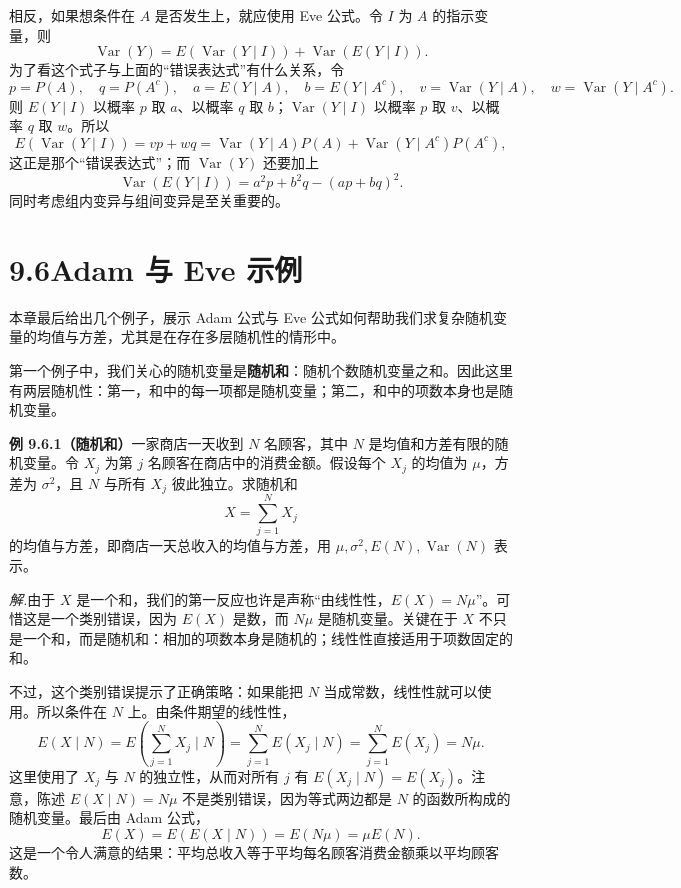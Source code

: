 \documentclass[UTF8, 12pt, fontset=fandol, oneside]{ctexart}
\begin{document}
相反，如果想条件在 $A$ 是否发生上，就应使用 Eve 公式。令 $I$ 为 $A$ 的指示变量，则
\[
  \operatorname{Var}(Y)=E(\operatorname{Var}(Y\mid I))+\operatorname{Var}(E(Y\mid I)).
\]
为了看这个式子与上面的“错误表达式”有什么关系，令
\[
  p=P(A),\quad q=P(A^c),\quad a=E(Y\mid A),\quad b=E(Y\mid A^c),
  \quad v=\operatorname{Var}(Y\mid A),\quad w=\operatorname{Var}(Y\mid A^c).
\]
则 $E(Y\mid I)$ 以概率 $p$ 取 $a$、以概率 $q$ 取 $b$；$\operatorname{Var}(Y\mid I)$ 以概率 $p$ 取 $v$、以概率 $q$ 取 $w$。所以
\[
  E(\operatorname{Var}(Y\mid I))
  =vp+wq=\operatorname{Var}(Y\mid A)P(A)+\operatorname{Var}(Y\mid A^c)P(A^c),
\]
这正是那个“错误表达式”；而 $\operatorname{Var}(Y)$ 还要加上
\[
  \operatorname{Var}(E(Y\mid I))=a^2p+b^2q-(ap+bq)^2.
\]
同时考虑组内变异与组间变异是至关重要的。

\section*{9.6\quad Adam 与 Eve 示例}

本章最后给出几个例子，展示 Adam 公式与 Eve 公式如何帮助我们求复杂随机变量的均值与方差，尤其是在存在多层随机性的情形中。

第一个例子中，我们关心的随机变量是\textbf{随机和}：随机个数随机变量之和。因此这里有两层随机性：第一，和中的每一项都是随机变量；第二，和中的项数本身也是随机变量。

\noindent\textbf{例 9.6.1（随机和）}\quad 一家商店一天收到 $N$ 名顾客，其中 $N$ 是均值和方差有限的随机变量。令 $X_j$ 为第 $j$ 名顾客在商店中的消费金额。假设每个 $X_j$ 的均值为 $\mu$，方差为 $\sigma^2$，且 $N$ 与所有 $X_j$ 彼此独立。求随机和
\[
  X=\sum_{j=1}^{N}X_j
\]
的均值与方差，即商店一天总收入的均值与方差，用 $\mu,\sigma^2,E(N),\operatorname{Var}(N)$ 表示。

\noindent\textit{解.}\quad 由于 $X$ 是一个和，我们的第一反应也许是声称“由线性性，$E(X)=N\mu$”。可惜这是一个类别错误，因为 $E(X)$ 是数，而 $N\mu$ 是随机变量。关键在于 $X$ 不只是一个和，而是随机和：相加的项数本身是随机的；线性性直接适用于项数固定的和。

不过，这个类别错误提示了正确策略：如果能把 $N$ 当成常数，线性性就可以使用。所以条件在 $N$ 上。由条件期望的线性性，
\[
  E(X\mid N)
  =E\left(\sum_{j=1}^{N}X_j\mid N\right)
  =\sum_{j=1}^{N}E(X_j\mid N)
  =\sum_{j=1}^{N}E(X_j)=N\mu.
\]
这里使用了 $X_j$ 与 $N$ 的独立性，从而对所有 $j$ 有 $E(X_j\mid N)=E(X_j)$。注意，陈述 $E(X\mid N)=N\mu$ 不是类别错误，因为等式两边都是 $N$ 的函数所构成的随机变量。最后由 Adam 公式，
\[
  E(X)=E(E(X\mid N))=E(N\mu)=\mu E(N).
\]
这是一个令人满意的结果：平均总收入等于平均每名顾客消费金额乘以平均顾客数。
\end{document}
